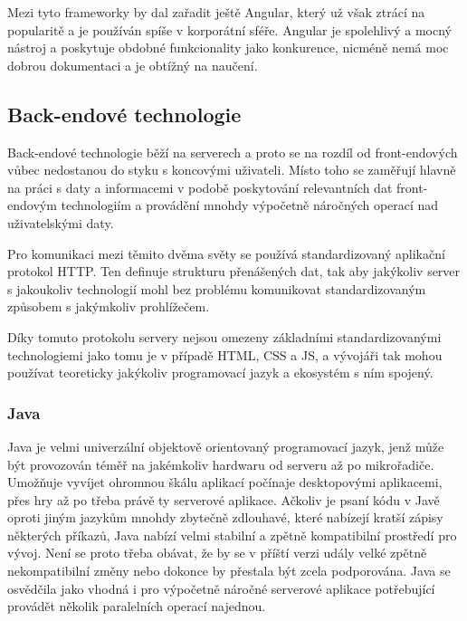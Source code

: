 		Mezi tyto frameworky by dal zařadit ještě Angular, který už však ztrácí na popularitě a je používán spíše v
		korporátní sféře.
		Angular je spolehlivý a mocný nástroj a poskytuje obdobné funkcionality jako konkurence,
		nicméně nemá moc dobrou dokumentaci a je obtížný na naučení. \cite{react_vs_angular}

	\subsection{Back-endové technologie}

	Back-endové technologie běží na serverech a proto se na rozdíl od front-endových vůbec nedostanou do styku s koncovými uživateli.
	Místo toho se zaměřují hlavně na práci s daty a informacemi v podobě poskytování relevantních dat front-endovým
	technologiím a provádění mnohdy výpočetně náročných operací nad uživatelskými daty.

	Pro komunikaci mezi těmito dvěma světy se používá standardizovaný aplikační protokol \noindent\Ac{HTTP}.
	Ten definuje strukturu přenášených dat, tak aby jakýkoliv server s jakoukoliv technologií mohl bez problému komunikovat
	standardizovaným způsobem s jakýmkoliv prohlížečem. \cite{http}

	Díky tomuto protokolu servery nejsou omezeny základními standardizovanými technologiemi jako tomu je v případě
	\Ac{HTML}, \Ac{CSS} a \ac{JS}, a vývojáři tak mohou používat teoreticky jakýkoliv programovací jazyk a ekosystém s ním
	spojený.

		\subsubsection{Java}

		Java je velmi univerzální objektově orientovaný programovací jazyk, jenž může být provozován téměř na jakémkoliv
		hardwaru od serveru až po mikrořadiče.
		Umožňuje vyvíjet ohromnou škálu aplikací počínaje desktopovými aplikacemi, přes hry až po třeba právě ty
		serverové aplikace. \cite{java}
		Ačkoliv je psaní kódu v Javě oproti jiným jazykům mnohdy zbytečně zdlouhavé, které nabízejí kratší zápisy
		některých příkazů, Java nabízí velmi stabilní a zpětně kompatibilní prostředí pro vývoj.
		Není se proto třeba obávat, že by se v příští verzi udály velké zpětně nekompatibilní změny nebo dokonce
		by přestala být zcela podporována.
		Java se osvědčila jako vhodná i pro výpočetně náročné serverové aplikace potřebující provádět několik paralelních
		operací najednou.

